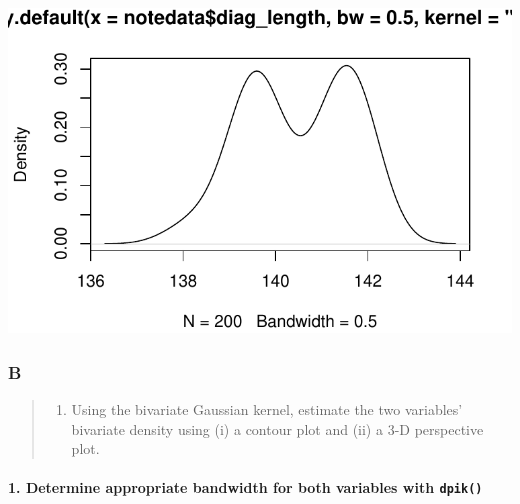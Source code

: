 \documentclass[
]{article}
\newenvironment{Shaded}{\begin{snugshade}}{\end{snugshade}}
\newcommand{\KeywordTok}[1]{\textcolor[rgb]{0.13,0.29,0.53}{\textbf{#1}}}
\newcommand{\NormalTok}[1]{#1}
\newcommand{\OperatorTok}[1]{\textcolor[rgb]{0.81,0.36,0.00}{\textbf{#1}}}
\newcommand{\StringTok}[1]{\textcolor[rgb]{0.31,0.60,0.02}{#1}}
\providecommand{\tightlist}{%
  \setlength{\itemsep}{0pt}\setlength{\parskip}{0pt}}
\begin{document}
\begin{center}\includegraphics{2.0-Multivariate-Visualization-Assignment_files/figure-latex/unnamed-chunk-12-1} \end{center}

\hypertarget{b}{%
\subsubsection{B}\label{b}}

\begin{quote}
\begin{enumerate}
\def\labelenumi{\alph{enumi})}
\setcounter{enumi}{1}
\tightlist
\item
  Using the bivariate Gaussian kernel, estimate the two variables'
  bivariate density using (i) a contour plot and (ii) a 3-D perspective
  plot.
\end{enumerate}
\end{quote}

\hypertarget{determine-appropriate-bandwidth-for-both-variables-with-dpik}{%
\paragraph{\texorpdfstring{\textbf{1. Determine appropriate bandwidth
for both variables with
\texttt{dpik()}}}{1. Determine appropriate bandwidth for both variables with dpik()}}\label{determine-appropriate-bandwidth-for-both-variables-with-dpik}}

\begin{Shaded}
\end{Shaded}
\end{document}
